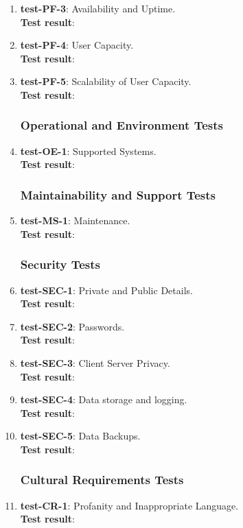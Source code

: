 \documentclass[12pt, titlepage]{article}
\begin{document}
\begin{enumerate}
	\item{\textbf{test-PF-3}}: Availability and Uptime.\\
	\textbf{Test result}:
	
	\item{\textbf{test-PF-4}}: User Capacity.\\
	\textbf{Test result}:
	
	\item{\textbf{test-PF-5}}: Scalability of User Capacity.\\
	\textbf{Test result}:
	
\subsubsection{Operational and Environment Tests}
	\item{\textbf{test-OE-1}}: Supported Systems.\\
	\textbf{Test result}:
	
\subsubsection{Maintainability and Support Tests}
	\item{\textbf{test-MS-1}}: Maintenance.\\
	\textbf{Test result}:
	
\subsubsection{Security Tests}
	\item{\textbf{test-SEC-1}}: Private and Public Details.\\
	\textbf{Test result}:
	
	\item{\textbf{test-SEC-2}}: Passwords.\\
	\textbf{Test result}:
	
	\item{\textbf{test-SEC-3}}: Client Server Privacy.\\
	\textbf{Test result}:
	
	\item{\textbf{test-SEC-4}}: Data storage and logging.\\
	\textbf{Test result}:
	
	\item{\textbf{test-SEC-5}}: Data Backups.\\
	\textbf{Test result}:
	
\subsubsection{Cultural Requirements Tests}
	\item{\textbf{test-CR-1}}: Profanity and Inappropriate Language.\\
	\textbf{Test result}:
	

\end{enumerate}
\end{document}
